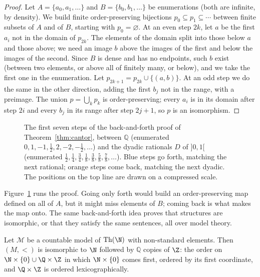 \begin{proof}
Let $A=\{a_0,a_1,\dots\}$ and $B=\{b_0,b_1,\dots\}$ be enumerations (both are infinite, by density). We build finite order-preserving bijections $p_0\subseteq p_1\subseteq\cdots$ between finite subsets of $A$ and of $B$, starting with $p_0=\varnothing$. At an even step $2k$, let $a$ be the first $a_i$ not in the domain of $p_{2k}$. The elements of the domain split into those below $a$ and those above; we need an image $b$ above the images of the first and below the images of the second. Since $B$ is dense and has no endpoints, such $b$ exist (between two elements, or above all of finitely many, or below), and we take the first one in the enumeration. Let $p_{2k+1}=p_{2k}\cup\{(a,b)\}$. At an odd step we do the same in the other direction, adding the first $b_j$ not in the range, with a preimage. The union $p=\bigcup_kp_k$ is order-preserving; every $a_i$ is in its domain after step $2i$ and every $b_j$ in its range after step $2j+1$, so $p$ is an isomorphism.
\end{proof}

\begin{figure}[ht]
\centering
{}
\caption{The first seven steps of the back-and-forth proof of Theorem~\ref{thm:cantor}, between $\mathbb Q$ (enumerated $0,1,-1,\frac12,2,-2,-\frac12,\dots$) and the dyadic rationals $D$ of $]0,1[$ (enumerated $\frac12,\frac14,\frac34,\frac18,\frac38,\frac58,\frac78,\dots$). Blue steps go forth, matching the next rational; orange steps come back, matching the next dyadic. The positions on the top line are drawn on a compressed scale.}
\label{fig:backforth}
\end{figure}

Figure~\ref{fig:backforth} runs the proof. Going only forth would build an order-preserving map defined on all of $A$, but it might miss elements of $B$; coming back is what makes the map onto. The same back-and-forth idea proves that structures are isomorphic, or that they satisfy the same sentences, all over model theory.

\begin{theorem}\label{thm:ordertype}
Let $\mathcal M$ be a countable model of $\mathrm{Th}(\N)$ with non-standard elements. Then $(M,<)$ is isomorphic to $\N$ followed by $\mathbb Q$ copies of $\Z$: the order on $\N\times\{0\}\cup\Q\times\Z$ in which $\N\times\{0\}$ comes first, ordered by its first coordinate, and $\Q\times\Z$ is ordered lexicographically.
\end{theorem}

